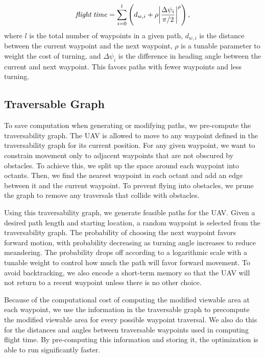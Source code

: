 \documentclass[letterpaper, 10 pt, conference]{ieeeconf}  %
\begin{document}
\begin{equation}%
    \mathit{flight\: time} = \sum_{i=0}^{l} \left(d_{w,i} + \rho\abs{\frac{\Delta \psi_i}{\pi/2}}^{\rho}\right) \text{,}
\end{equation}
%
where $l$ is the total number of waypoints in a given path, $d_{w,i}$ is the distance between the current waypoint and the next waypoint, $\rho$ is a tunable parameter to weight the cost of turning, and $\Delta \psi_i$ is the difference in heading angle between the current and next waypoint. This favors paths with fewer waypoints and less turning.

\subsection{Traversable Graph}

To save computation when generating or modifying paths, we pre-compute the traversability graph. The UAV is allowed to move to any waypoint defined in the traversability graph for its current position. For any given waypoint, we want to constrain movement only to adjacent waypoints that are not obscured by obstacles. To achieve this, we split up the space around each waypoint into octants. Then, we find the nearest waypoint in each octant and add an edge between it and the current waypoint. To prevent flying into obstacles, we prune the graph to remove any traversals that collide with obstacles.

Using this traversability graph, we generate feasible paths for the UAV. Given a desired path length and starting location, a random waypoint is selected from the traversability graph. The probability of choosing the next waypoint favors forward motion, with probability decreasing as turning angle increases to reduce meandering. The probability drops off according to a logarithmic scale with a tunable weight to control how much the path will favor forward movement. To avoid backtracking, we also encode a short-term memory so that the UAV will not return to a recent waypoint unless there is no other choice.

Because of the computational cost of computing the modified viewable area at each waypoint, we use the information in the traversable graph to precompute the modified viewable area for every possible waypoint traversal. We also do this for the distances and angles between traversable waypoints used in computing flight time. By pre-computing this information and storing it, the optimization is able to run significantly faster.
\end{document}
